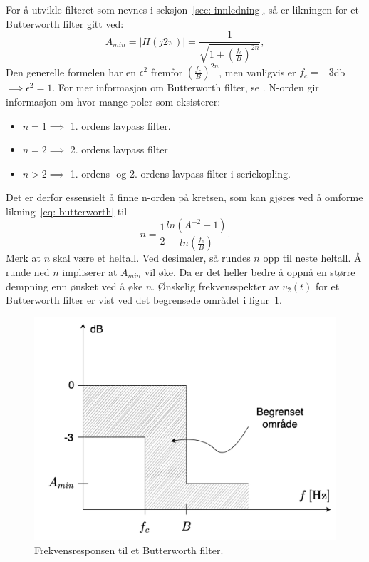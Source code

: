 \documentclass[a4paper,11pt,norsk]{article}
\begin{document}
\\\\
For å utvikle filteret som nevnes i seksjon~\ref{sec: innledning}, så er likningen for et Butterworth filter gitt ved:
\begin{equation} \label{eq: butterworth}
    A_{min} = |H(j2\pi)| = \frac{1}{\sqrt{1+ \left(\frac{f_c}{B}\right)^{2n}}},
\end{equation}
Den generelle formelen har en $\epsilon^2$ fremfor $\left(\frac{f_c}{B}\right)^{2n}$, men vanligvis er $f_c = -3$db$ \implies \epsilon^2 = 1$. For mer informasjon om Butterworth filter, se \cite{Butterworth-filter}.
\newpage
N-orden gir informasjon om hvor mange poler som eksisterer:
\begin{itemize}\label{list: filter}
    \item $n=1 \implies$ 1. ordens lavpass filter.
    \item $n=2 \implies$ 2. ordens lavpass filter
    \item $n > 2 \implies$  1. ordens- og 2. ordens-lavpass filter i seriekopling.
\end{itemize}
Det er derfor essensielt å finne n-orden på kretsen, som kan gjøres ved å omforme likning~\ref{eq: butterworth} til
\begin{equation}\label{eq: n-orden}
    n = \frac{1}{2} \frac{ln(A^{-2}-1)}{ln\left( \frac{f_c}{B} \right)}.
\end{equation}
Merk at $n$ skal være et heltall. Ved desimaler, så rundes $n$ opp til neste heltall. Å runde ned $n$ impliserer at $A_{min}$ vil øke. Da er det heller bedre å oppnå en større dempning enn ønsket ved å øke $n$. Ønskelig frekvensspekter av $v_2(t)$ for et Butterworth filter er vist ved det begrensede området i figur~\ref{fig: Butterworth signal}.
\\
\begin{figure}[htbp]
    \centering
    \includegraphics[width=1.0\textwidth]{img/Skisse signal.PNG}
    \caption{Frekvensresponsen til et Butterworth filter.}
    \label{fig: Butterworth signal}
\end{figure} \\
\end{document}
